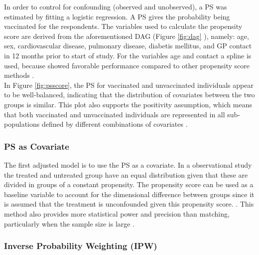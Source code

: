 \documentclass[
]{article}
\begin{document}
In order to control for confounding (observed and unobserved), a PS was estimated by fitting a logistic regression. A PS gives the probability being vaccinated for the respondents. The variables used to calculate the propensity score are derived from the aforementioned DAG (Figure \ref{fig:dag} ), namely: age, sex, cardiovascular disease, pulmonary disease, diabetis mellitus, and GP contact in 12 months prior to start of study. For the variables age and contact a spline is used, because showed favorable performance compared to other propensity score methods \citep{Tian}.\\
\hspace*{0.333em}\hspace*{0.333em}\hspace*{0.333em}\hspace*{0.333em}In Figure \ref{fig:psscore}, the PS for vaccinated and unvaccinated individuals appear to be well-balanced, indicating that the distribution of covariates between the two groups is similar. This plot also supports the positivity assumption, which means that both vaccinated and unvaccinated individuals are represented in all sub-populations defined by different combinations of covariates \citep{westreich}.

\hypertarget{ps-as-covariate}{%
\subsubsection{PS as Covariate}\label{ps-as-covariate}}

The first adjusted model is to use the PS as a covariate. In a observational study the treated and untreated group have an equal distribution given that these are divided in groups of a constant propensity. The propensity score can be used as a baseline variable to account for the dimensional difference between groups since it is assumed that the treatment is unconfounded given this propensity score. \citep{schafer}. This method also provides more statistical power and precision than matching, particularly when the sample size is large \citep{austin}.

\hypertarget{inverse-probability-weighting-ipw}{%
\subsubsection{Inverse Probability Weighting (IPW)}\label{inverse-probability-weighting-ipw}}
\end{document}
